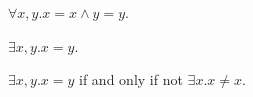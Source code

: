 \begin{proposition}\label{formula_test_forall}
    $\forall x, y. x = x\land y = y$.
\end{proposition}

\begin{proposition}\label{formula_test_exists}
    $\exists x, y. x = y$.
\end{proposition}

\begin{proposition}\label{formula_test_not_exists}
    $\exists x, y. x = y$ if and only if not $\exists x. x \neq x$.
\end{proposition}
